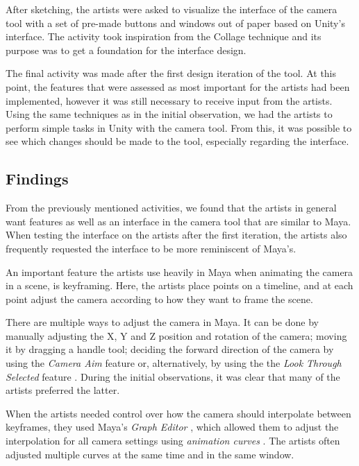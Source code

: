 After sketching, the artists were asked to visualize the interface of the camera tool with a set of pre-made buttons and windows out of paper based on Unity's interface. The activity took inspiration from the Collage technique \cite{part_design} and its purpose was to get a foundation for the interface design.

The final activity was made after the first design iteration of the tool. At this point, the features that were assessed as most important for the artists had been implemented, however it was still necessary to receive input from the artists. Using the same techniques as in the initial observation, we had the artists to perform simple tasks in Unity with the camera tool. From this, it was possible to see which changes should be made to the tool, especially regarding the interface.

\subsection{Findings}
From the previously mentioned activities, we found that the artists in general want features as well as an interface in the camera tool that are similar to Maya. When testing the interface on the artists after the first iteration, the artists also frequently requested the interface to be more reminiscent of Maya's.

An important feature the artists use heavily in Maya when animating the camera in a scene, is keyframing. Here, the artists place points on a timeline, and at each point adjust the camera according to how they want to frame the scene.

There are multiple ways to adjust the camera in Maya. It can be done by manually adjusting the X, Y and Z position and rotation of the camera; moving it by dragging a handle tool; deciding the forward direction of the camera by using the \textit{Camera Aim} feature \cite{maya_camAim} or, alternatively, by using the the \textit{Look Through Selected} feature \cite{maya_lookThrough}. During the initial observations, it was clear that many of the artists preferred the latter.

When the artists needed control over how the camera should interpolate between keyframes, they used   Maya's \textit{Graph Editor} \cite{maya_graph}, which allowed them to adjust the interpolation for all camera settings using \textit{animation curves} \cite{maya_graph}. The artists often adjusted multiple curves at the same time and in the same window.

